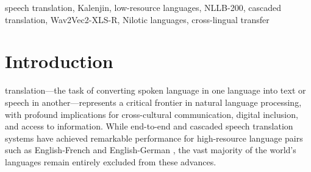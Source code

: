 \documentclass[conference]{IEEEtran}
\begin{document}
\begin{abstract}
Speech translation for under-resourced African languages remains a critical unsolved challenge, limiting digital inclusion for millions of speakers. This paper presents a cascaded speech translation pipeline for Kalenjin, a tonal, agglutinative Southern Nilotic language spoken by 5--6 million people in Kenya's Rift Valley. Our system chains a fine-tuned Wav2Vec2-XLS-R-300M automatic speech recognition (ASR) model---achieving 61.75\% Word Error Rate (WER) and 20.11\% Character Error Rate (CER)---with Meta's NLLB-200 neural machine translation model for Kalenjin-to-English translation. Since Kalenjin is not among NLLB-200's 202 supported languages, we investigate cross-lingual transfer via typologically related proxy languages: Nuer (Western Nilotic), Luo (Western Nilotic), and Swahili (Bantu). We evaluate zero-shot translation quality, analyze the cascaded error propagation between ASR and machine translation components, and establish the first documented speech translation baseline for Kalenjin. This work demonstrates a reproducible methodology for extending speech translation to languages absent from current multilingual models, with implications for practical deployment in education, healthcare, and governance across linguistically diverse African communities.
\end{abstract}

\begin{IEEEkeywords}
speech translation, Kalenjin, low-resource languages, NLLB-200, cascaded translation, Wav2Vec2-XLS-R, Nilotic languages, cross-lingual transfer
\end{IEEEkeywords}

\section{Introduction}

 translation---the task of converting spoken language in one language into text or speech in another---represents a critical frontier in natural language processing, with profound implications for cross-cultural communication, digital inclusion, and access to information. While end-to-end and cascaded speech translation systems have achieved remarkable performance for high-resource language pairs such as English-French and English-German \cite{sperber2020speech, anastasopoulos2022findings}, the vast majority of the world's languages remain entirely excluded from these advances.
\end{document}
